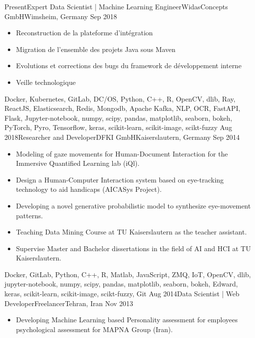 %
%
%
\begin{experiences}
  \experience
  {Present}{Expert Data Scientist | Machine Learning Engineer}{WidasConcepts GmbH}{Wimsheim, Germany}
  {Sep 2018} {
    \begin{itemize}
      \item Reconstruction de la plateforme d'intégration
      \item Migration de l'ensemble des projets Java sous Maven
      \item Evolutions et corrections des bugs du framework de développement interne
      \item Veille technologique
    \end{itemize}
  }
    {Docker, Kubernetes, GitLab, DC/OS, Python, C++, R,  OpenCV, dlib, Ray, ReactJS, Elasticsearch, Redis, Mongodb, Apache Kafka, NLP, OCR, FastAPI, Flask, Jupyter-notebook, numpy, scipy, pandas, matplotlib, seaborn, bokeh, PyTorch, Pyro, Tensorflow, keras, scikit-learn, scikit-image, scikt-fuzzy}
    \emptySeparator
  \experience
  {Aug 2018}{Researcher and Developer}{DFKI GmbH}{Kaiserslautern, Germany}
  {Sep 2014} {
    \begin{itemize}
      \item Modeling of gaze movements for Human-Document Interaction for the Immersive Quantified Learning lab (iQl).
      \item Design a Human-Computer Interaction system based on eye-tracking technology to aid handicaps (AICASys Project).
      \item Developing a novel generative probabilistic model to synthesize eye-movement patterns.
      \item Teaching Data Mining Course at TU Kaiserslautern as the teacher assistant.
    \item Supervise Master and Bachelor dissertations in the field of AI and HCI at TU Kaiserslautern.

    \end{itemize}
  }
    {Docker, GitLab, Python, C++, R, Matlab, JavaScript, ZMQ, IoT, OpenCV, dlib, jupyter-notebook, numpy, scipy, pandas, matplotlib, seaborn, bokeh, Edward, keras, scikit-learn, scikit-image, scikt-fuzzy, Git}
    \emptySeparator
  \experience
  {Aug 2014}{Data Scientist | Web Developer}{Freelancer}{Tehran, Iran}
  {Nov 2013} {
    \begin{itemize}
      \item Developing Machine Learning based Personality assessment for employees psychological assessment for MAPNA Group (Iran).


\end{itemize}}
\end{experiences}
